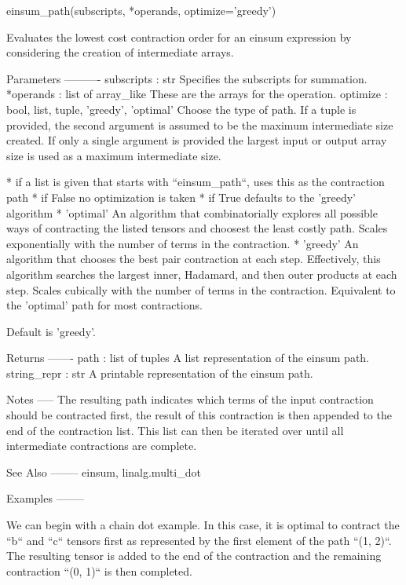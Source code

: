 \begin{DoxyVerb}einsum_path(subscripts, *operands, optimize='greedy')

Evaluates the lowest cost contraction order for an einsum expression by
considering the creation of intermediate arrays.

Parameters
----------
subscripts : str
    Specifies the subscripts for summation.
*operands : list of array_like
    These are the arrays for the operation.
optimize : {bool, list, tuple, 'greedy', 'optimal'}
    Choose the type of path. If a tuple is provided, the second argument is
    assumed to be the maximum intermediate size created. If only a single
    argument is provided the largest input or output array size is used
    as a maximum intermediate size.

    * if a list is given that starts with ``einsum_path``, uses this as the
      contraction path
    * if False no optimization is taken
    * if True defaults to the 'greedy' algorithm
    * 'optimal' An algorithm that combinatorially explores all possible
      ways of contracting the listed tensors and choosest the least costly
      path. Scales exponentially with the number of terms in the
      contraction.
    * 'greedy' An algorithm that chooses the best pair contraction
      at each step. Effectively, this algorithm searches the largest inner,
      Hadamard, and then outer products at each step. Scales cubically with
      the number of terms in the contraction. Equivalent to the 'optimal'
      path for most contractions.

    Default is 'greedy'.

Returns
-------
path : list of tuples
    A list representation of the einsum path.
string_repr : str
    A printable representation of the einsum path.

Notes
-----
The resulting path indicates which terms of the input contraction should be
contracted first, the result of this contraction is then appended to the
end of the contraction list. This list can then be iterated over until all
intermediate contractions are complete.

See Also
--------
einsum, linalg.multi_dot

Examples
--------

We can begin with a chain dot example. In this case, it is optimal to
contract the ``b`` and ``c`` tensors first as represented by the first
element of the path ``(1, 2)``. The resulting tensor is added to the end
of the contraction and the remaining contraction ``(0, 1)`` is then
completed.


\end{DoxyVerb}
